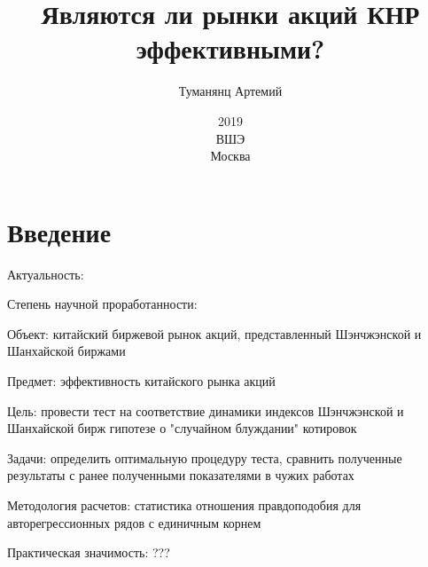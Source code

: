 ﻿\documentclass[a4paper,12pt]{article}
\title{Являются ли рынки акций КНР эффективными?}
\author{Туманянц Артемий}
\date{2019\\ВШЭ\\Москва}
\begin{document}
\maketitle
\newpage
\tableofcontents
\newpage
\section{Введение}
Актуальность:

Степень научной проработанности:

Объект: китайский биржевой рынок акций, представленный Шэнчжэнской и Шанхайской биржами

Предмет: эффективность китайского рынка акций

Цель: провести тест на соответствие динамики индексов Шэнчжэнской и Шанхайской бирж гипотезе о "случайном блуждании" котировок

Задачи: определить оптимальную процедуру теста, сравнить полученные результаты с ранее полученными показателями в чужих работах

Методология расчетов: статистика отношения правдоподобия для авторегрессионных рядов с единичным корнем

Практическая значимость: ???
\newpage
\end{document}
